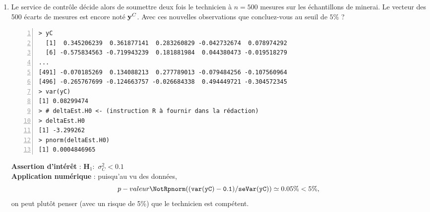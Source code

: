 \documentclass[10pt]{report}
\begin{document}
\begin{exercice}
\begin{enumerate}
\begin{Correction}
La conclusion du précédent test n'autorise pas le service de contrôle à penser que le technicien n'est pas compétent. Pour pouvoir montrer ceci il doit effectuer le test suivant~: $\mathbf{H_1}: \sigma_C^2>0.1$. Or, $\Est{\delta_{\sigma_C^2,0.1}}{y^C}\simeq -0.5474 \ngtr \delta_{lim,5\%}^+\simeq 1.645$. En conclusion, on ne peut vraiment rien dire au vu des données (avec un risque de 5\%)!
\end{Correction}


\item Le service de contr{\^o}le d{\'e}cide alors de soumettre deux fois le technicien {\`a} $n=500$ mesures sur les {\'e}chantillons de minerai. Le vecteur des 500 {\'e}carts de mesures est encore not{\'e} ${\bf y}^C$. Avec ces nouvelles observations que concluez-vous au seuil de $5 \%$ ? \\

\IndicR
\begin{Verbatim}[frame=leftline,fontfamily=tt,fontshape=n,numbers=left]
> yC
  [1]  0.345206239  0.361877141  0.283260829 -0.042732674  0.078974292
  [6] -0.575834563 -0.719943239  0.181881984  0.044380473 -0.019518279
...
[491] -0.070185269  0.134088213  0.277789013 -0.079484256 -0.107560964
[496] -0.265767699 -0.124663757 -0.026684338  0.494449721 -0.304572345
> var(yC)
[1] 0.08299474
> # deltaEst.H0 <- (instruction R à fournir dans la rédaction)
> deltaEst.H0
[1] -3.299262
> pnorm(deltaEst.H0)
[1] 0.0004846965
\end{Verbatim}

 

\begin{Correction}

\noindent \textbf{Assertion d'intérêt} :  $\mathbf{H}_1:$ $\sigma^2_{C}<0.1$ \\
\textbf{Application numérique} :  puisqu'au vu des données, 
  \[
p-valeur\NotR\mathtt{pnorm((var(yC)-0.1)/seVar(yC))} \simeq 0.05\% < 5\%,
\]
on peut plutôt penser (avec un risque de 5\%) que le technicien est compétent.
\end{Correction}

\end{enumerate}
\end{exercice}
\end{document}
